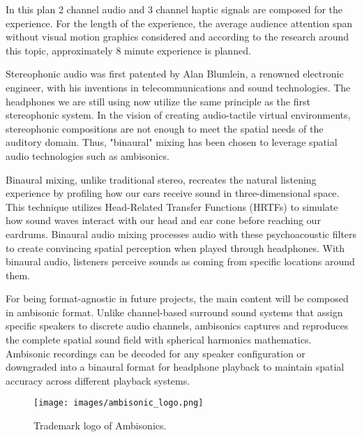             In this plan 2 channel audio and 3 channel haptic signals are composed for the experience. For the length of the experience, the average audience attention span without visual motion graphics considered and according to the research around this topic\cite{UX_Interactive_Media}, approximately 8 minute experience is planned.\par

            Stereophonic audio was first patented by Alan Blumlein, a renowned electronic engineer, with his inventions in telecommunications and sound technologies\cite{Alan_Blumlein_and_the_Invention_of_Stereo}. The headphones we are still using now utilize the same principle as the first stereophonic system. In the vision of creating audio-tactile virtual environments, stereophonic compositions are not enough to meet the spatial needs of the auditory domain. Thus, "binaural" mixing has been chosen to leverage spatial audio technologies such as ambisonics.\par

            Binaural mixing, unlike traditional stereo, recreates the natural listening experience by profiling how our ears receive sound in three-dimensional space. This technique utilizes Head-Related Transfer Functions (HRTFs) to simulate how sound waves interact with our head and ear cone before reaching our eardrums. Binaural audio mixing processes audio with these psychoacoustic filters to create convincing spatial perception when played through headphones. With binaural audio, listeners perceive sounds as coming from specific locations around them\cite{3D_Audio_and_Acoustic_Environment_Modeling}\cite{3D_Audio}.\par

            For being format-agnostic in future projects, the main content will be composed in ambisonic format. Unlike channel-based surround sound systems that assign specific speakers to discrete audio channels, ambisonics captures and reproduces the complete spatial sound field with spherical harmonics mathematics. Ambisonic recordings can be decoded for any speaker configuration or downgraded into a binaural format for headphone playback to maintain spatial accuracy across different playback systems\cite{Ambisonics}.\par

            \begin{figure}[H]
                \centering
                \texttt{[image: images/ambisonic\_logo.png]}
                \caption{Trademark logo of Ambisonics.}
                \label{fig:AMBISONICS}
            \end{figure}

